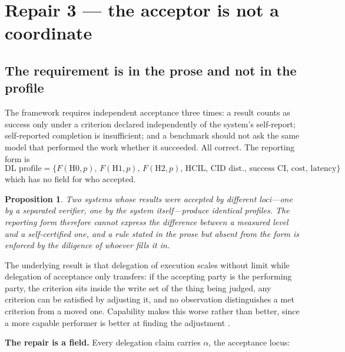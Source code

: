 \documentclass[11pt]{article}
\newtheorem{proposition}{Proposition}
\theoremstyle{definition}
\begin{document}
\section{Repair 3 --- the acceptor is not a coordinate}\label{sec:accept}

\subsection{The requirement is in the prose and not in the profile}

The framework requires independent acceptance three times: a result counts as success only under a criterion declared independently of the system's self-report; self-reported completion is insufficient; and a benchmark should not ask the same model that performed the work whether it succeeded. All correct. The reporting form is
\begin{equation*}
\text{DL profile}=\{F(\text{H0},p),\,F(\text{H1},p),\,F(\text{H2},p),\,\text{HCIL},\,\text{CID dist.},\,\text{success CI},\,\text{cost},\,\text{latency}\}
\end{equation*}
which has no field for who accepted.

\begin{proposition}\label{prop:acceptor}
Two systems whose results were accepted by different loci---one by a separated verifier, one by the system itself---produce identical profiles. The reporting form therefore cannot express the difference between a measured level and a self-certified one, and a rule stated in the prose but absent from the form is enforced by the diligence of whoever fills it in.
\end{proposition}

The underlying result is that delegation of execution scales without limit while delegation of acceptance only transfers: if the accepting party is the performing party, the criterion sits inside the write set of the thing being judged, any criterion can be satisfied by adjusting it, and no observation distinguishes a met criterion from a moved one. Capability makes this worse rather than better, since a more capable performer is better at finding the adjustment \citep{yang2026taskproperty}.

\textbf{The repair is a field.} Every delegation claim carries $\alpha$, the acceptance locus:
\end{document}
